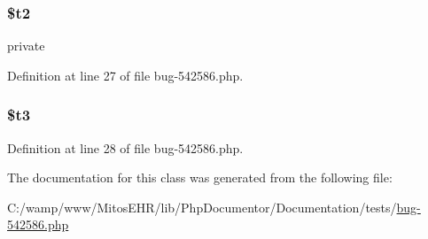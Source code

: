 \hypertarget{classctest_ada6018ac685736ba5c6bdfd69473d134}{
\subsubsection[{\$t2}]{\setlength{\rightskip}{0pt plus 5cm}\$t2}}\label{classctest_ada6018ac685736ba5c6bdfd69473d134}
private 

\-Definition at line 27 of file bug-\/542586.\-php.

\hypertarget{classctest_a8a7574f69b6c839e80adbdc3811de29e}{
\subsubsection[{\$t3}]{\setlength{\rightskip}{0pt plus 5cm}\$t3}}\label{classctest_a8a7574f69b6c839e80adbdc3811de29e}


\-Definition at line 28 of file bug-\/542586.\-php.



\-The documentation for this class was generated from the following file\-:\begin{DoxyCompactItemize}
\item 
\-C\-:/wamp/www/\-Mitos\-E\-H\-R/lib/\-Php\-Documentor/\-Documentation/tests/\hyperlink{bug-542586_8php}{bug-\/542586.\-php}\end{DoxyCompactItemize}
